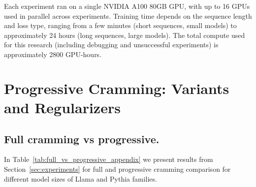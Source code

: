 Each experiment ran on a single NVIDIA A100 80GB GPU, with up to 16 GPUs used in parallel across experiments. Training time depends on the sequence length and loss type, ranging from a few minutes (short sequences, small models) to approximately 24 hours (long sequences, large models). The total compute used for this research (including debugging and unsuccessful experiments) is approximately 2800 GPU-hours.


\section{Progressive Cramming: Variants and Regularizers}
\label{app:part_method}

\subsection{Full cramming vs progressive.}
\label{app:1}

In Table~\ref{tab:full_vs_progressive_appendix} we present results from Section~\ref{sec:experiments} for full and progressive cramming comparison for different model sizes of Llama and Pythia families.

\begin{table}[!htbp]
    \caption{Full vs. progressive cramming on PG19 (mean $\pm$ std over samples). ``Full'' cramming \cite{kuratov2025cramming} uses a fixed token budget and may stop below perfect Teacher Forcing (TF) reconstruction; progressive cramming fixes reconstruction at 100\% and guarantees perfect reconstruction under autoregressive greedy generation.}
    \label{tab:full_vs_progressive_appendix}
    \begin{center}
    \begin{small}
    
    \end{small}
    \end{center}
\vskip -0.1in
\end{table}

\begin{table}[tb]
    \caption{Results of the learning-rate sweep across models and settings. ``Compressed Tokens'' is the achieved prefix length $n$, ``Trajectory Length'' is $L_{\text{traj}}$, and ``PCA 99\%'' is the number of principal components explaining 99\% of trajectory variance.}
    \label{tab:all_learning_rates}
    \begin{center}
    \begin{small}
    
    \end{small}
    \end{center}
  \vskip -0.1in
\end{table}

